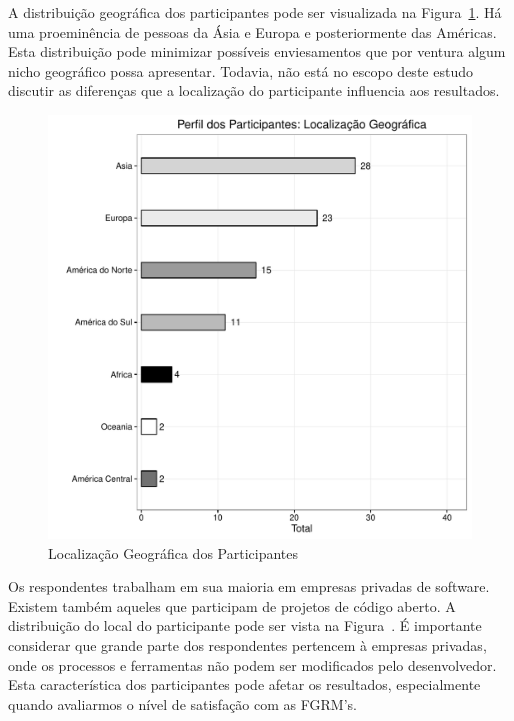 A distribuição geográfica dos participantes pode ser visualizada na
Figura~\ref{fig:grafico_melhorias_fgrm_localizacao_geografica}. Há uma
proeminência de pessoas da Ásia e Europa e posteriormente das Américas. Esta
distribuição pode minimizar possíveis enviesamentos que por ventura algum nicho
geográfico possa apresentar. Todavia, não está no escopo deste estudo discutir
as diferenças que a localização do participante influencia aos resultados. 

\begin{figure}[htpb]
	\centering
	\includegraphics[width=0.8\linewidth]{./chapter-pesquisa-com-profissionais/img/grafico_melhorias_fgrm_localizacao_geografica.pdf}
	\caption{Localização Geográfica dos Participantes}
\label{fig:grafico_melhorias_fgrm_localizacao_geografica}
\end{figure}

Os respondentes trabalham em sua maioria em empresas privadas de software.
Existem também aqueles que participam de projetos de código aberto. A
distribuição do local do participante pode ser vista na
Figura~\cite{fig:grafico_melhorias_fgrm_local_trabalho}. É importante considerar
que grande parte dos respondentes pertencem à empresas privadas, onde os
processos e ferramentas não podem ser modificados pelo desenvolvedor. Esta
característica dos participantes pode afetar os resultados, especialmente quando
	avaliarmos o nível de satisfação com as FGRM's. 

